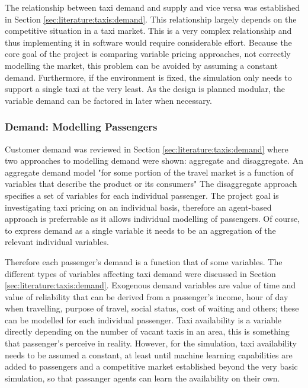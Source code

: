 The relationship between taxi demand and supply and vice versa was established
in Section \ref{sec:literature:taxis:demand}. This relationship largely depends
on the competitive situation in a taxi market. This is a very complex
relationship and thus implementing it in software would require considerable
effort. Because the core goal of the project is comparing variable pricing
approaches, not correctly modelling the market, this problem can be avoided by
assuming a constant demand. Furthermore, if the environment is fixed, the
simulation only needs to support a single taxi at the very least. As the design
is planned modular, the variable demand can be factored in later when
necessary.


\subsubsection{Demand: Modelling Passengers}
\label{sec:requirements:passenger}

Customer demand was reviewed in Section \ref{sec:literature:taxis:demand} where
two approaches to modelling demand were shown: aggregate and disaggregate. An
aggregate demand model "for some portion of the travel market is a function of
variables that describe the product or its consumers"
\parencite{Small2007taxi+urban} The disaggregate approach specifies a set of
variables for each individual passenger. The project goal is investigating taxi
pricing on an individual basis, therefore an agent-based approach is
preferrable as it allows individual modelling of passengers. Of course, to
express demand as a single variable it needs to be an aggregation of the
relevant individual variables.

Therefore each passenger's demand is a function that of some variables. The
different types of variables affecting taxi demand were discussed in Section
\ref{sec:literature:taxis:demand}. Exogenous demand variables are value of time
and value of reliability that can be derived from a passenger's income, hour of
day when travelling, purpose of travel, social status, cost of waiting and
others; these can be modelled for each individual passenger. Taxi availability
is a variable directly depending on the number of vacant taxis in an area, this
is something that passenger's perceive in reality. However, for the simulation,
taxi availability needs to be assumed a constant, at least until machine
learning capabilities are added to passengers and a competitive market
established beyond the very basic simulation, so that passanger agents can
learn the availability on their own.

